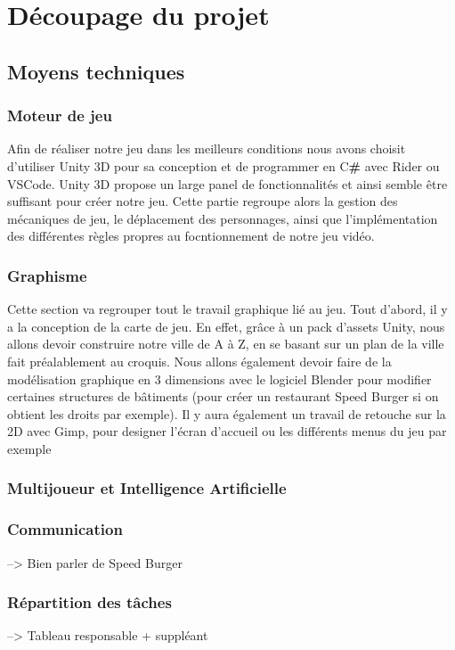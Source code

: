 \documentclass[11pt,a4paper]{article}
\newcommand{\AI}{Intelligence Artificielle}
\begin{document}
\section{Découpage du projet}
\subsection{Moyens techniques}
    \subsubsection{Moteur de jeu}
    Afin de réaliser notre jeu dans les meilleurs conditions nous avons choisit d’utiliser Unity 3D pour sa conception et de programmer en C\textbf{#} avec Rider ou VSCode. Unity 3D propose un large panel de fonctionnalités et ainsi semble être suffisant pour créer notre jeu. Cette partie regroupe alors la gestion des mécaniques de jeu, le déplacement des personnages, ainsi que l'implémentation des différentes règles propres au focntionnement de notre jeu vidéo.
      
    \subsubsection{Graphisme}
    Cette section va regrouper tout le travail graphique lié au jeu. Tout d'abord, il y a la conception de la carte de jeu. En effet, grâce à un pack d’assets Unity, nous allons devoir construire notre ville de A à Z, en se basant sur un plan de la ville fait préalablement au croquis. Nous allons également devoir faire de la modélisation graphique en 3 dimensions avec le logiciel Blender pour modifier certaines structures de bâtiments (pour créer un restaurant Speed Burger si on obtient les droits par exemple). Il y aura également un travail de retouche sur la 2D avec Gimp, pour designer l’écran d’accueil ou les différents menus du jeu par exemple
      
    \subsubsection{Multijoueur et \AI}
      
    \subsubsection{Communication}
    --> Bien parler de Speed Burger
    \subsubsection{Répartition des tâches}
      --> Tableau responsable + suppléant 
\end{document}
